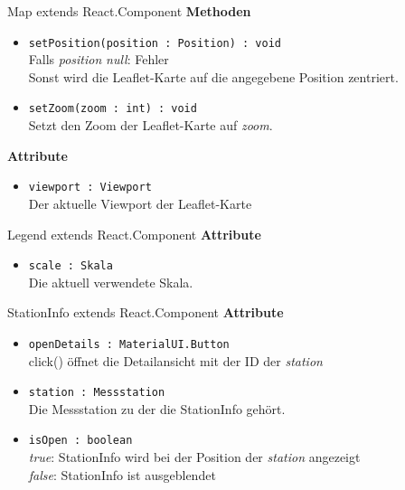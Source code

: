 \begin{Class}{Map extends React.Component}
    \textbf{Methoden}
    \begin{itemize}
        \item \texttt{setPosition(position : Position) : void}
        \\ Falls \emph{position} \emph{null}: Fehler
        \\ Sonst wird die Leaflet-Karte auf die angegebene Position zentriert.
        \item \texttt{setZoom(zoom : int) : void}
        \\ Setzt den Zoom der Leaflet-Karte auf \emph{zoom}.
    \end{itemize}
    \textbf{Attribute}
    \begin{itemize}
        \item \texttt{viewport : Viewport}
        \\ Der aktuelle Viewport der Leaflet-Karte
    \end{itemize}
\end{Class}

\begin{Class}{Legend extends React.Component}
    \textbf{Attribute}
    \begin{itemize}
        \item \texttt{scale : Skala}
        \\ Die aktuell verwendete Skala.
    \end{itemize}
\end{Class}

\begin{Class}{StationInfo extends React.Component}
    \textbf{Attribute}
    \begin{itemize}
        \item \texttt{openDetails : MaterialUI.Button}
        \\ click() öffnet die Detailansicht mit der ID der \emph{station}
        \item \texttt{station : Messstation}
        \\ Die Messstation zu der die StationInfo gehört.
        \item \texttt{isOpen : boolean}
        \\ \emph{true}: StationInfo wird bei der Position der \emph{station} angezeigt
        \\ \emph{false}: StationInfo ist ausgeblendet
    \end{itemize}
\end{Class}

